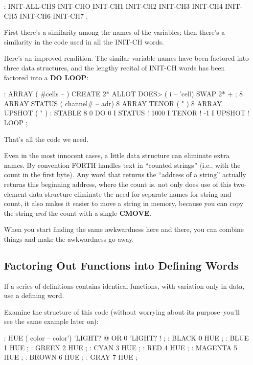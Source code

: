 \begin{Code} 
: INIT-ALL-CHS    INIT-CHO  INIT-CH1  INIT-CH2  INIT-CH3
   INIT-CH4  INIT-CH5  INIT-CH6  INIT-CH7 ;
\end{Code}
First there's a similarity among the names of the variables; then there's a similarity in the code used in all the INIT-CH words.

Here's an improved rendition. The similar variable names have been factored into three data structures, and the lengthy recital of INIT-CH words has been factored into a \textbf{DO LOOP}:

\begin{Code}
: ARRAY  ( #cells -- )  CREATE  2* ALLOT
   DOES> ( i -- 'cell)  SWAP  2* + ; 
8 ARRAY STATUS  ( channel# -- adr)
8 ARRAY TENOR   (        "       )
8 ARRAY UPSHOT  (        "       )
: STABLE   8 0 DO  0 I STATUS !  1000 I TENOR ! 
   -1 I UPSHOT !  LOOP ;
\end{Code}

\noindent That's all the code we need.

Even in the most innocent cases, a little data structure can eliminate extra names. By convention FORTH handles text in ``counted strings'' (i.e., with the count in the first byte). Any word that returns the ``address of a string'' actually returns this beginning address, where the count is. not only does use of this two-element data structure eliminate the need for separate names for string and count, it also makes it easier to move a string in memory, because you can copy the string \emph{and} the count
with a single \textbf{CMOVE}.

When you start finding the same awkwardness here and there, you can combine things and make the awkwardness go away.

\subsection{{Factoring Out Functions into Defining Words}}

\begin{tip}
If a series of definitions contains identical functions, with variation only in data, use a defining word.
\end{tip}
Examine the structure of this code (without worrying about its purpose--you'll see the same example later on):

\begin{Code}
: HUE  ( color -- color') 
   'LIGHT? @  OR  0 'LIGHT? ! ;
: BLACK   0 HUE ;
: BLUE   1 HUE ;
: GREEN   2 HUE ;
: CYAN   3 HUE ;
: RED   4 HUE ;
: MAGENTA   5 HUE ;
: BROWN   6 HUE ;
: GRAY   7 HUE ;
\end{Code}


